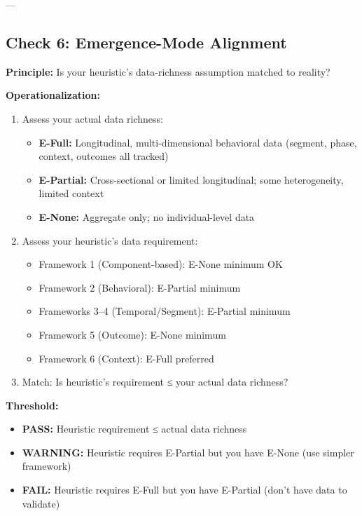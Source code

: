 ---

\subsection{Check 6: Emergence-Mode Alignment}
\label{subsec:20-check-6}

\textbf{Principle:} Is your heuristic's data-richness assumption matched to reality?

\textbf{Operationalization:}

\begin{enumerate}
\item Assess your actual data richness:
  \begin{itemize}[nosep]
  \item \textbf{E-Full:} Longitudinal, multi-dimensional behavioral data (segment, phase, context, outcomes all tracked)
  \item \textbf{E-Partial:} Cross-sectional or limited longitudinal; some heterogeneity, limited context
  \item \textbf{E-None:} Aggregate only; no individual-level data
  \end{itemize}
\item Assess your heuristic's data requirement:
  \begin{itemize}[nosep]
  \item Framework 1 (Component-based): E-None minimum OK
  \item Framework 2 (Behavioral): E-Partial minimum
  \item Frameworks 3--4 (Temporal/Segment): E-Partial minimum
  \item Framework 5 (Outcome): E-None minimum
  \item Framework 6 (Context): E-Full preferred
  \end{itemize}
\item Match: Is heuristic's requirement ≤ your actual data richness?
\end{enumerate}

\textbf{Threshold:}
\begin{itemize}[nosep]
\item \textbf{PASS:} Heuristic requirement ≤ actual data richness
\item \textbf{WARNING:} Heuristic requires E-Partial but you have E-None (use simpler framework)
\item \textbf{FAIL:} Heuristic requires E-Full but you have E-Partial (don't have data to validate)
\end{itemize}

